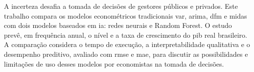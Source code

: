 	A incerteza desafia a tomada de decisões de gestores públicos e privados. Este trabalho compara os modelos econométricos tradicionais \ac{var}, \ac{arima}, \ac{dfm} e \ac{midas} com dois modelos baseados em \ac{ia}: redes neurais e Random Forest. O estudo prevê, em frequência anual, o nível e a taxa de crescimento do \ac{pib} real brasileiro. A comparação considera o tempo de execução, a interpretabilidade qualitativa e o desempenho preditivo, avaliado com \ac{rmse} e \ac{mae}, para discutir as possibilidades e limitações de uso desses modelos por economistas na tomada de decisões.
	

